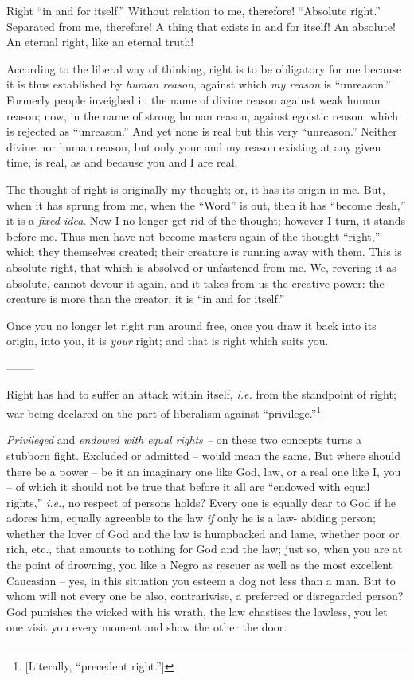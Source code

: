Right ``in and for itself.'' Without relation to me, therefore! ``Absolute 
right.'' Separated from me, therefore! A thing that exists in and for itself! 
An absolute! An eternal right, like an eternal truth!

According to the liberal way of thinking, right is to be obligatory for me 
because it is thus established by \textit{human reason}, against which 
\textit{my reason} is ``unreason.'' Formerly people inveighed in the name of 
divine reason against weak human reason; now, in the name of strong human 
reason, against egoistic reason, which is rejected as ``unreason.'' And yet 
none is real but this very ``unreason.'' Neither divine nor human reason, 
but only your and my reason existing at any given time, is real, as and 
because you and I are real.

The thought of right is originally my thought; or, it has its origin in me. 
But, when it has sprung from me, when the ``Word'' is out, then it has 
``become flesh,'' it is a \textit{fixed idea}. Now I no longer get rid of 
the thought; however I turn, it stands before me. Thus men have not become 
masters again of the thought ``right,'' which they themselves created; their 
creature is running away with them. This is absolute right, that which is 
absolved or unfastened from me. We, revering it as absolute, cannot devour it 
again, and it takes from us the creative power: the creature is more than the 
creator, it is ``in and for itself.''

Once you no longer let right run around free, once you draw it back into its 
origin, into you, it is \textit{your} right; and that is right which suits 
you.

\begin{center}
--------\end{center}


Right has had to suffer an attack within itself, \textit{i.e.} from the 
standpoint of right; war being declared on the part of liberalism against 
``privilege.''\footnote{[Literally, ``precedent right.'']}

\textit{Privileged} and \textit{endowed with equal rights --} on these two 
concepts turns a stubborn fight. Excluded or admitted -- would mean the same. 
But where should there be a power -- be it an imaginary one like God, law, or 
a real one like I, you -- of which it should not be true that before it all 
are ``endowed with equal rights,'' \textit{i.e.}, no respect of persons 
holds? Every one is equally dear to God if he adores him, equally agreeable to 
the law \textit{if} only he is a law- abiding person; whether the lover of God 
and the law is humpbacked and lame, whether poor or rich, etc., that amounts 
to nothing for God and the law; just so, when you are at the point of 
drowning, you like a Negro as rescuer as well as the most excellent Caucasian 
-- yes, in this situation you esteem a dog not less than a man. But to whom 
will not every one be also, contrariwise, a preferred or disregarded person? 
God punishes the wicked with his wrath, the law chastises the lawless, you let 
one visit you every moment and show the other the door.

